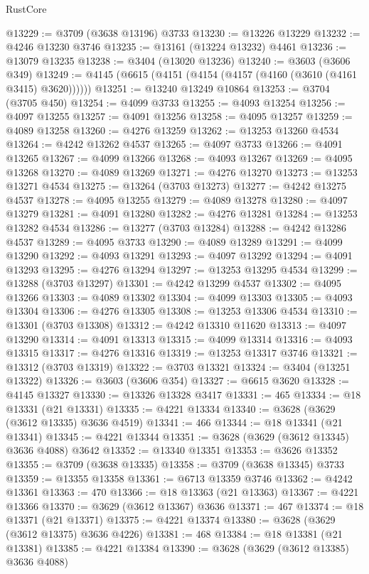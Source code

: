 \begin{lexlean}{RustCore}
\begin{coremodule}
@13229 := @3709 (@3638 @13196) @3733
@13230 := @13226 @13229
@13232 := @4246 @13230 @3746
@13235 := @13161 (@13224 @13232) @4461
@13236 := @13079 @13235
@13238 := @3404 (@13020 @13236)
@13240 := @3603 (@3606 @349)
@13249 := @4145 (@6615 (@4151 (@4154 (@4157 (@4160 (@3610 (@4161 @3415) @3620))))))
@13251 := @13240 @13249 @10864
@13253 := @3704 (@3705 @450)
@13254 := @4099 @3733
@13255 := @4093 @13254
@13256 := @4097 @13255
@13257 := @4091 @13256
@13258 := @4095 @13257
@13259 := @4089 @13258
@13260 := @4276 @13259
@13262 := @13253 @13260 @4534
@13264 := @4242 @13262 @4537
@13265 := @4097 @3733
@13266 := @4091 @13265
@13267 := @4099 @13266
@13268 := @4093 @13267
@13269 := @4095 @13268
@13270 := @4089 @13269
@13271 := @4276 @13270
@13273 := @13253 @13271 @4534
@13275 := @13264 (@3703 @13273)
@13277 := @4242 @13275 @4537
@13278 := @4095 @13255
@13279 := @4089 @13278
@13280 := @4097 @13279
@13281 := @4091 @13280
@13282 := @4276 @13281
@13284 := @13253 @13282 @4534
@13286 := @13277 (@3703 @13284)
@13288 := @4242 @13286 @4537
@13289 := @4095 @3733
@13290 := @4089 @13289
@13291 := @4099 @13290
@13292 := @4093 @13291
@13293 := @4097 @13292
@13294 := @4091 @13293
@13295 := @4276 @13294
@13297 := @13253 @13295 @4534
@13299 := @13288 (@3703 @13297)
@13301 := @4242 @13299 @4537
@13302 := @4095 @13266
@13303 := @4089 @13302
@13304 := @4099 @13303
@13305 := @4093 @13304
@13306 := @4276 @13305
@13308 := @13253 @13306 @4534
@13310 := @13301 (@3703 @13308)
@13312 := @4242 @13310 @11620
@13313 := @4097 @13290
@13314 := @4091 @13313
@13315 := @4099 @13314
@13316 := @4093 @13315
@13317 := @4276 @13316
@13319 := @13253 @13317 @3746
@13321 := @13312 (@3703 @13319)
@13322 := @3703 @13321
@13324 := @3404 (@13251 @13322)
@13326 := @3603 (@3606 @354)
@13327 := @6615 @3620
@13328 := @4145 @13327
@13330 := @13326 @13328 @3417
@13331 := 465
@13334 := @18 @13331 (@21 @13331)
@13335 := @4221 @13334
@13340 := @3628 (@3629 (@3612 @13335) @3636 @4519)
@13341 := 466
@13344 := @18 @13341 (@21 @13341)
@13345 := @4221 @13344
@13351 := @3628 (@3629 (@3612 @13345) @3636 @4088) @3642
@13352 := @13340 @13351
@13353 := @3626 @13352
@13355 := @3709 (@3638 @13335)
@13358 := @3709 (@3638 @13345) @3733
@13359 := @13355 @13358
@13361 := @6713 @13359 @3746
@13362 := @4242 @13361
@13363 := 470
@13366 := @18 @13363 (@21 @13363)
@13367 := @4221 @13366
@13370 := @3629 (@3612 @13367) @3636
@13371 := 467
@13374 := @18 @13371 (@21 @13371)
@13375 := @4221 @13374
@13380 := @3628 (@3629 (@3612 @13375) @3636 @4226)
@13381 := 468
@13384 := @18 @13381 (@21 @13381)
@13385 := @4221 @13384
@13390 := @3628 (@3629 (@3612 @13385) @3636 @4088)

\end{coremodule}
\end{lexlean}

